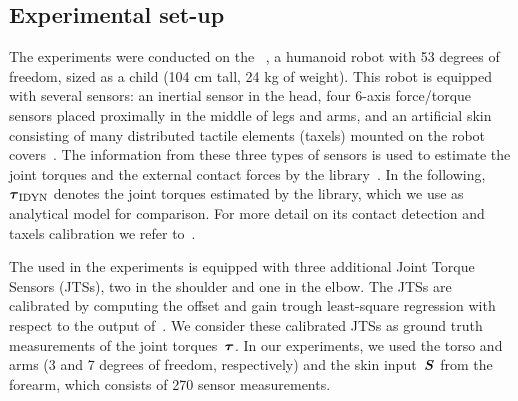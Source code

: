 \subsection{Experimental set-up}

The experiments were conducted on the \robot{}~\cite{Natale2013}, a
humanoid robot with 53 degrees of freedom, sized as a child (104 cm tall, 24 kg
of weight). This robot is equipped with several sensors: an inertial sensor in
the head, four 6-axis force/torque sensors placed proximally in the middle of
legs and arms, and an artificial skin consisting of many distributed tactile
elements (taxels) mounted on the robot covers~\cite{Cannata2008}. The
information from these three types of sensors is used to estimate the joint
torques and the external contact forces by the \idyn{} 
library~\cite{Ivaldi2011}. In the following, $\boldsymbol{\tau}_{\rm IDYN}$ denotes the
joint torques estimated by the \idyn{} library, which we use as analytical model
for comparison. For more detail on its contact detection and taxels calibration
we refer to~\cite{DelPrete2011,DelPrete2012}.
	
 
The \robot{} used in the experiments is equipped with three additional Joint
Torque Sensors (JTSs), two in the shoulder and one in the elbow. The JTSs are
calibrated by computing the offset and gain trough least-square regression with
respect to the output of~\idyn{}. We consider these calibrated JTSs as ground
truth measurements of the joint torques~$\boldsymbol{\tau}$. In our experiments, we
used the \robot{} torso and arms (3 and 7 degrees of freedom, respectively) and
the skin input~$\mathcal{\boldsymbol{S}}$ from the forearm, which consists of 270 sensor
measurements.

